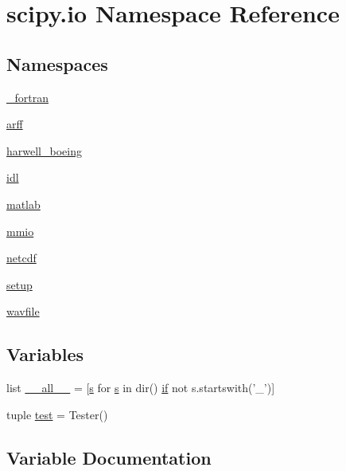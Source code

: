 \hypertarget{namespacescipy_1_1io}{}\section{scipy.\+io Namespace Reference}
\label{namespacescipy_1_1io}
\subsection*{Namespaces}
\begin{DoxyCompactItemize}
\item 
 \hyperlink{namespacescipy_1_1io_1_1__fortran}{\+\_\+fortran}
\item 
 \hyperlink{namespacescipy_1_1io_1_1arff}{arff}
\item 
 \hyperlink{namespacescipy_1_1io_1_1harwell__boeing}{harwell\+\_\+boeing}
\item 
 \hyperlink{namespacescipy_1_1io_1_1idl}{idl}
\item 
 \hyperlink{namespacescipy_1_1io_1_1matlab}{matlab}
\item 
 \hyperlink{namespacescipy_1_1io_1_1mmio}{mmio}
\item 
 \hyperlink{namespacescipy_1_1io_1_1netcdf}{netcdf}
\item 
 \hyperlink{namespacescipy_1_1io_1_1setup}{setup}
\item 
 \hyperlink{namespacescipy_1_1io_1_1wavfile}{wavfile}
\end{DoxyCompactItemize}
\subsection*{Variables}
\begin{DoxyCompactItemize}
\item 
list \hyperlink{namespacescipy_1_1io_a8a30db83c98e4b0529669fa0d23058c1}{\+\_\+\+\_\+all\+\_\+\+\_\+} = \mbox{[}\hyperlink{indexexpr_8h_ae024b0db549122b44c349ae28ec990dc}{s} for \hyperlink{indexexpr_8h_ae024b0db549122b44c349ae28ec990dc}{s} in dir() \hyperlink{minmax_8h_a30a0ee9fee303f01d9c5e6f669e0dfe9}{if} not s.\+startswith('\+\_\+')\mbox{]}
\item 
tuple \hyperlink{namespacescipy_1_1io_ad5fbfd6f6d543703dd69dffa57c43063}{test} = Tester()
\end{DoxyCompactItemize}


\subsection{Variable Documentation}
\hypertarget{namespacescipy_1_1io_a8a30db83c98e4b0529669fa0d23058c1}{}
